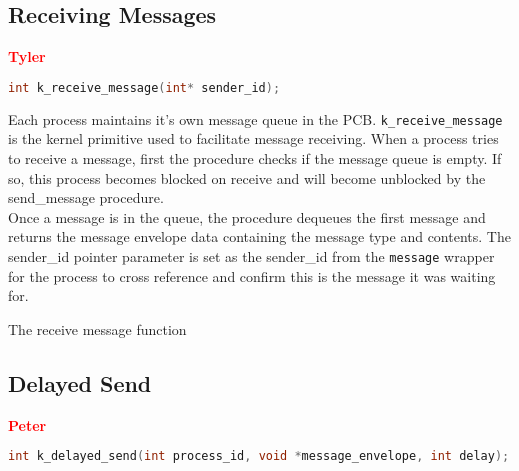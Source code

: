 \documentclass[12pt]{report}
\begin{document}
\subsection{Receiving Messages}

\textcolor{red}{\textbf{Tyler}} \\
\begin{minipage}{\textwidth}
\begin{lstlisting}[language=C, frame=single]
int k_receive_message(int* sender_id);
\end{lstlisting}
\end{minipage}

Each process maintains it's own message queue in the PCB. {\tt k\_receive\_message} is the kernel primitive used to facilitate message receiving. When a process tries to receive a message, first the procedure checks if the message queue is empty. If so, this process becomes blocked on receive and will become unblocked by the send_message procedure. \\

Once a message is in the queue, the procedure dequeues the first message and returns the message envelope data containing the message type and contents. The sender_id pointer parameter is set as the sender_id from the {\tt message} wrapper for the process to cross reference and confirm this is the message it was waiting for. \\

\begin{algorithm}
  \caption{The receive message function}
  \begin{algorithmic}[1]
		\EndWhile
    \EndProcedure
  \end{algorithmic}
\end{algorithm}

\subsection{Delayed Send}

\textcolor{red}{\textbf{Peter}} \\

\begin{minipage}{\textwidth}
\begin{lstlisting}[language=C, frame=single]
int k_delayed_send(int process_id, void *message_envelope, int delay);
\end{lstlisting}
\end{minipage}
\end{document}
